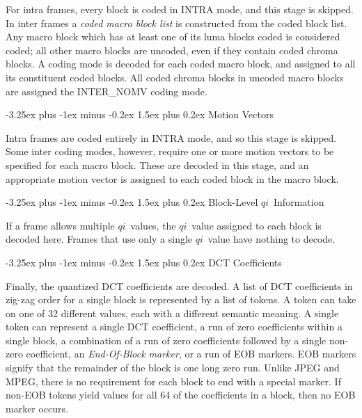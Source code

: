\documentclass[9pt,letterpaper]{book}
\makeatletter
\newcommand{\idx}[1]{{\ensuremath{\mathit{#1}}}}
\newcommand{\qi}{\idx{qi}}
\newcommand{\term}[1]{{\em #1}}
\numberwithin{equation}{chapter}
\numberwithin{figure}{chapter}
\numberwithin{table}{chapter}
\renewcommand{\paragraph}{\@startsection{paragraph}{4}{0ex}%
 {-3.25ex plus -1ex minus -0.2ex}%
 {1.5ex plus 0.2ex}%
 {\normalfont\normalsize\bfseries}}
\makeatother
\begin{document}
For intra frames, every block is coded in INTRA mode, and this stage is
 skipped.
In inter frames a \term{coded macro block list} is constructed from the coded
 block list.
Any macro block which has at least one of its luma blocks coded is considered
 coded; all other macro blocks are uncoded, even if they contain coded chroma
 blocks.
A coding mode is decoded for each coded macro block, and assigned to all its
 constituent coded blocks.
All coded chroma blocks in uncoded macro blocks are assigned the INTER\_NOMV
 coding mode.

\paragraph{Motion Vectors}

Intra frames are coded entirely in INTRA mode, and so this stage is skipped.
Some inter coding modes, however, require one or more motion vectors to be
 specified for each macro block.
These are decoded in this stage, and an appropriate motion vector is assigned
 to each coded block in the macro block.

\paragraph{Block-Level \qi\ Information}

If a frame allows multiple \qi\ values, the \qi\ value assigned to each block
 is decoded here.
Frames that use only a single \qi\ value have nothing to decode.

\paragraph{DCT Coefficients}

Finally, the quantized DCT coefficients are decoded.
A list of DCT coefficients in zig-zag order for a single block is represented
 by a list of tokens.
A token can take on one of 32 different values, each with a different semantic
 meaning.
A single token can represent a single DCT coefficient, a run of zero
 coefficients within a single block, a combination of a run of zero
 coefficients followed by a single non-zero coefficient, an
 \term{End-Of-Block marker}, or a run of EOB markers.
EOB markers signify that the remainder of the block is one long zero run.
Unlike JPEG and MPEG, there is no requirement for each block to end with 
 a special marker.
If non-EOB tokens yield values for all 64 of the coefficients in a block, then
 no EOB marker occurs.
\end{document}
